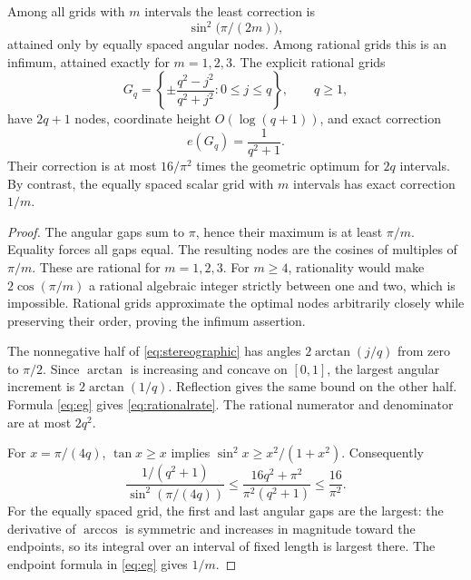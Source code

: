 \begin{theorem}\label{thm:optimalgrid}
Among all grids with $m$ intervals the least correction is
\[
 \sin^2\bigl(\pi/(2m)\bigr),
\]
attained only by equally spaced angular nodes. Among rational grids this is an infimum, attained exactly for $m=1,2,3$. The explicit rational grids
\begin{equation}\label{eq:stereographic}
 G_q=\left\{\pm\frac{q^2-j^2}{q^2+j^2}:0\le j\le q\right\},\qquad q\ge1,
\end{equation}
have $2q+1$ nodes, coordinate height $O(\log(q+1))$, and exact correction
\begin{equation}\label{eq:rationalrate}
 e(G_q)=\frac1{q^2+1}.
\end{equation}
Their correction is at most $16/\pi^2$ times the geometric optimum for $2q$ intervals. By contrast, the equally spaced scalar grid with $m$ intervals has exact correction $1/m$.
\end{theorem}
\begin{proof}
The angular gaps sum to $\pi$, hence their maximum is at least $\pi/m$. Equality forces all gaps equal. The resulting nodes are the cosines of multiples of $\pi/m$. These are rational for $m=1,2,3$. For $m\ge4$, rationality would make $2\cos(\pi/m)$ a rational algebraic integer strictly between one and two, which is impossible. Rational grids approximate the optimal nodes arbitrarily closely while preserving their order, proving the infimum assertion.

The nonnegative half of \eqref{eq:stereographic} has angles $2\arctan(j/q)$ from zero to $\pi/2$. Since $\arctan$ is increasing and concave on $[0,1]$, the largest angular increment is $2\arctan(1/q)$. Reflection gives the same bound on the other half. Formula \eqref{eq:eg} gives \eqref{eq:rationalrate}. The rational numerator and denominator are at most $2q^2$.

For $x=\pi/(4q)$, $\tan x\ge x$ implies $\sin^2x\ge x^2/(1+x^2)$. Consequently
\[
 \frac{1/(q^2+1)}{\sin^2(\pi/(4q))}\le
 \frac{16q^2+\pi^2}{\pi^2(q^2+1)}\le\frac{16}{\pi^2}.
\]
For the equally spaced grid, the first and last angular gaps are the largest: the derivative of $\arccos$ is symmetric and increases in magnitude toward the endpoints, so its integral over an interval of fixed length is largest there. The endpoint formula in \eqref{eq:eg} gives $1/m$.
\end{proof}

